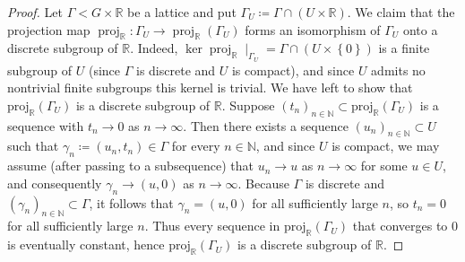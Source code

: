 \documentclass[10pt,a4paper]{amsart}
\begin{document}
\begin{proof}
Let \(\Gamma<G\times\mathbb{R}\) be a lattice and put \(\Gamma_{U}\coloneqq\Gamma\cap\left(U\times\mathbb{R}\right)\). We claim that the projection map \(\operatorname{proj}_{\mathbb{R}}:\Gamma_{U}\to\operatorname{proj}_{\mathbb{R}}\left(\Gamma_{U}\right)\) forms an isomorphism of \(\Gamma_{U}\) onto a discrete subgroup of \(\mathbb{R}\). Indeed, \(\ker\operatorname{proj}_{\mathbb{R}}\mid_{\Gamma_{U}}=\Gamma\cap\left(U\times\left\{ 0\right\} \right)\) is a finite subgroup of \(U\) (since \(\Gamma\) is discrete and \(U\) is compact), and since \(U\) admits no nontrivial finite subgroups this kernel is trivial. We have left to show that \(\mathrm{proj}_{\mathbb{R}}\left(\Gamma_{U}\right)\) is a discrete subgroup of \(\mathbb{R}\). Suppose \(\left(t_{n}\right)_{n\in\mathbb{N}}\subset\mathrm{proj}_{\mathbb{R}}\left(\Gamma_{U}\right)\) is a sequence with \(t_{n}\to0\) as \(n\to\infty\). Then there exists a sequence \(\left(u_{n}\right)_{n\in\mathbb{N}}\subset U\) such that \(\gamma_{n}\coloneqq\left(u_{n},t_{n}\right)\in\Gamma\) for every \(n\in\mathbb{N}\), and since \(U\) is compact, we may assume (after passing to a subsequence) that \(u_{n}\to u\) as \(n\to\infty\) for some \(u\in U\), and consequently \(\gamma_{n}\to\left(u,0\right)\) as \(n\to\infty\). Because \(\Gamma\) is discrete and \(\left(\gamma_{n}\right)_{n\in\mathbb{N}}\subset\Gamma\), it follows that \(\gamma_{n}=\left(u,0\right)\) for all sufficiently large \(n\), so \(t_{n}=0\) for all sufficiently large \(n\). Thus every sequence in \(\mathrm{proj}_{\mathbb{R}}\left(\Gamma_{U}\right)\) that converges to \(0\) is eventually constant, hence \(\mathrm{proj}_{\mathbb{R}}\left(\Gamma_{U}\right)\) is a discrete subgroup of \(\mathbb{R}\).


\end{proof}
\end{document}
